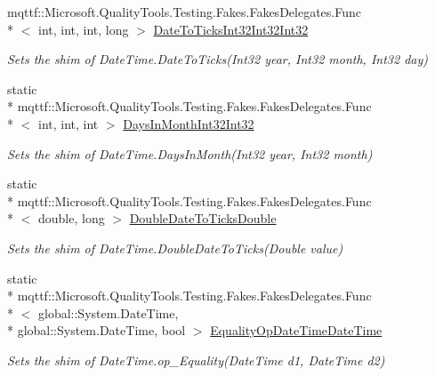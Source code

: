 \begin{DoxyCompactItemize}
mqttf\-::\-Microsoft.\-Quality\-Tools.\-Testing.\-Fakes.\-Fakes\-Delegates.\-Func\\*
$<$ int, int, int, long $>$ \hyperlink{class_system_1_1_fakes_1_1_shim_date_time_a57df748b5c1c93bd0bbc6a9a864dfcf8}{Date\-To\-Ticks\-Int32\-Int32\-Int32}
\begin{DoxyCompactList}\small\item\em Sets the shim of Date\-Time.\-Date\-To\-Ticks(\-Int32 year, Int32 month, Int32 day)\end{DoxyCompactList}\item 
static \\*
mqttf\-::\-Microsoft.\-Quality\-Tools.\-Testing.\-Fakes.\-Fakes\-Delegates.\-Func\\*
$<$ int, int, int $>$ \hyperlink{class_system_1_1_fakes_1_1_shim_date_time_a3510e5aa586dbea32408bcc2352e90d9}{Days\-In\-Month\-Int32\-Int32}
\begin{DoxyCompactList}\small\item\em Sets the shim of Date\-Time.\-Days\-In\-Month(\-Int32 year, Int32 month)\end{DoxyCompactList}\item 
static \\*
mqttf\-::\-Microsoft.\-Quality\-Tools.\-Testing.\-Fakes.\-Fakes\-Delegates.\-Func\\*
$<$ double, long $>$ \hyperlink{class_system_1_1_fakes_1_1_shim_date_time_af33423d592496b8150e8672cfb346e50}{Double\-Date\-To\-Ticks\-Double}
\begin{DoxyCompactList}\small\item\em Sets the shim of Date\-Time.\-Double\-Date\-To\-Ticks(\-Double value)\end{DoxyCompactList}\item 
static \\*
mqttf\-::\-Microsoft.\-Quality\-Tools.\-Testing.\-Fakes.\-Fakes\-Delegates.\-Func\\*
$<$ global\-::\-System.\-Date\-Time, \\*
global\-::\-System.\-Date\-Time, bool $>$ \hyperlink{class_system_1_1_fakes_1_1_shim_date_time_a245d7c148aea56bd3b3be2a8a5b58fcc}{Equality\-Op\-Date\-Time\-Date\-Time}
\begin{DoxyCompactList}\small\item\em Sets the shim of Date\-Time.\-op\-\_\-\-Equality(\-Date\-Time d1, Date\-Time d2)\end{DoxyCompactList}\item 

\end{DoxyCompactItemize}

